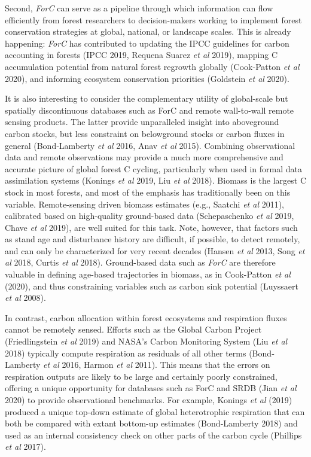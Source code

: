 \documentclass[
]{article}
\begin{document}
Second, \emph{ForC} can serve as a pipeline through which information
can flow efficiently from forest researchers to decision-makers working
to implement forest conservation strategies at global, national, or
landscape scales. This is already happening: \emph{ForC} has contributed
to updating the IPCC guidelines for carbon accounting in forests (IPCC
2019, Requena Suarez \emph{et al} 2019), mapping C accumulation
potential from natural forest regrowth globally (Cook-Patton \emph{et
al} 2020), and informing ecosystem conservation priorities (Goldstein
\emph{et al} 2020).

It is also interesting to consider the complementary utility of
global-scale but spatially discontinuous databases such as ForC and
remote wall-to-wall remote sensing products. The latter provide
unparalleled insight into aboveground carbon stocks, but less constraint
on belowground stocks or carbon fluxes in general (Bond‐Lamberty
\emph{et al} 2016, Anav \emph{et al} 2015). Combining observational data
and remote observations may provide a much more comprehensive and
accurate picture of global forest C cycling, particularly when used in
formal data assimilation systems (Konings \emph{et al} 2019, Liu
\emph{et al} 2018). Biomass is the largest C stock in most forests, and
most of the emphasis has traditionally been on this variable.
Remote-sensing driven biomass estimates (e.g., Saatchi \emph{et al}
2011), calibrated based on high-quality ground-based data (Schepaschenko
\emph{et al} 2019, Chave \emph{et al} 2019), are well suited for this
task. Note, however, that factors such as stand age and disturbance
history are difficult, if possible, to detect remotely, and can only be
characterized for very recent decades (Hansen \emph{et al} 2013, Song
\emph{et al} 2018, Curtis \emph{et al} 2018). Ground-based data such as
\emph{ForC} are therefore valuable in defining age-based trajectories in
biomass, as in Cook-Patton \emph{et al} (2020), and thus constraining
variables such as carbon sink potential (Luyssaert \emph{et al} 2008).

In contrast, carbon allocation within forest ecosystems and respiration
fluxes cannot be remotely sensed. Efforts such as the Global Carbon
Project (Friedlingstein \emph{et al} 2019) and NASA's Carbon Monitoring
System (Liu \emph{et al} 2018) typically compute respiration as
residuals of all other terms (Bond‐Lamberty \emph{et al} 2016, Harmon
\emph{et al} 2011). This means that the errors on respiration outputs
are likely to be large and certainly poorly constrained, offering a
unique opportunity for databases such as ForC and SRDB (Jian \emph{et
al} 2020) to provide observational benchmarks. For example, Konings
\emph{et al} (2019) produced a unique top-down estimate of global
heterotrophic respiration that can both be compared with extant
bottom-up estimates (Bond‐Lamberty 2018) and used as an internal
consistency check on other parts of the carbon cycle (Phillips \emph{et
al} 2017).
\end{document}
